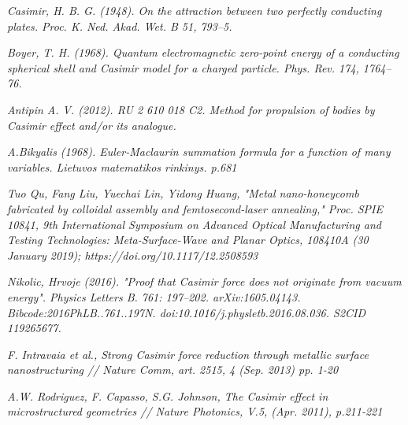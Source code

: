 \documentclass[twoside, 10pt]{article}
\begin{document}
\begin{multicols}{2}
    \begin{thebibliography}{99}

\textit{Casimir, H. B. G. (1948). On the attraction between two perfectly conducting plates. Proc. K. Ned. Akad. Wet. B 51, 793–5.
}

\textit{Boyer, T. H. (1968). Quantum electromagnetic zero-point energy of a conducting spherical shell and Casimir model for a charged particle. Phys. Rev. 174, 1764–76.}

\textit{Antipin A. V. (2012). RU 2 610 018 C2. Method for propulsion of bodies by Casimir effect and/or its analogue.}

\textit{A.Bikyalis (1968). Euler-Maclaurin summation formula for a function of many variables.  Lietuvos matematikos rinkinys. p.681
}

\textit{Tuo Qu, Fang Liu, Yuechai Lin, Yidong Huang, "Metal nano-honeycomb fabricated by colloidal assembly and femtosecond-laser annealing," Proc. SPIE 10841, 9th International Symposium on Advanced Optical Manufacturing and Testing Technologies: Meta-Surface-Wave and Planar Optics, 108410A (30 January 2019); https://doi.org/10.1117/12.2508593}

\textit{Nikolic, Hrvoje (2016). "Proof that Casimir force does not originate from vacuum energy". Physics Letters B. 761: 197–202. arXiv:1605.04143. Bibcode:2016PhLB..761..197N. doi:10.1016/j.physletb.2016.08.036. S2CID 119265677.}

\textit{F. Intravaia et al., Strong Casimir force reduction through metallic surface nanostructuring // Nature Comm, art. 2515, 4 (Sep. 2013) pp. 1-20}

\textit{A.W. Rodriguez, F. Capasso, S.G. Johnson, The Casimir effect in microstructured geometries // Nature Photonics, V.5, (Apr. 2011), p.211-221}

\end{thebibliography}

\end{multicols}

    
    
    
\end{document}
